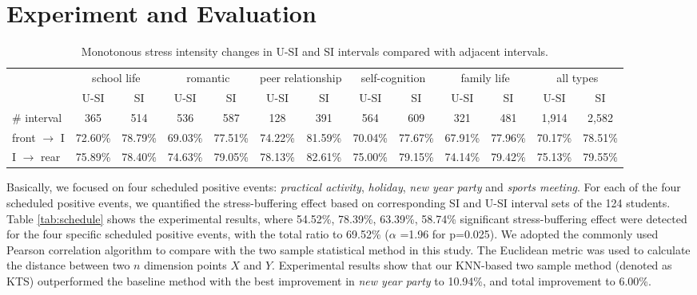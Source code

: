 
\section{Experiment and Evaluation}
\label{sec:experiment}

\begin{table}
\begin{center}
\caption{\small{Monotonous stress intensity changes in U-SI and SI intervals compared with adjacent intervals.}}
\small{
\begin{tabular}{l cccccc cccccc} \\\hline\hline
\multirow{2}{1cm}{}
&\multicolumn{2}{c}{school life}
&\multicolumn{2}{c}{romantic}
&\multicolumn{2}{c}{peer relationship}
&\multicolumn{2}{c}{self-cognition}
&\multicolumn{2}{c}{family life}
&\multicolumn{2}{c}{all types}\\
&U-SI	    &	SI	        &U-SI	    &SI	        &U-SI	   &SI	
&U-SI	    &	SI	        &	U-SI	&SI	        &U-SI	   &SI\\  \hline
\# interval         &   365	        &	514	        &	536	        &	587	        &128	    &	391	        &	564	           &	609	            &	321	        &	481	        &	1,914	    &2,582	 \\
front $\rightarrow$ I &	72.60\% &	78.79\% &	69.03\% 	&77.51\%   &74.22\%    &81.59\%    &70.04\%    &77.67\%  &67.91\%     &77.96\%    &70.17\%    &78.51\% \\
I $\rightarrow$ rear  &	75.89\% &	78.40\% &	74.63\% 	&79.05\%   &78.13\%    &82.61\%    &75.00\%    &79.15\%   &74.14\%    &79.42\%    &75.13\%    & 79.55\%\\ \hline \hline
\end{tabular}}%
\label{tab:fontrear}
\end{center}
\end{table}

Basically, we focused on four scheduled positive events:
\emph{practical activity}, \emph{holiday}, \emph{new year party} and \emph{sports meeting}.
For each of the four scheduled positive events,
we quantified the stress-buffering effect based on corresponding SI and U-SI interval sets of the 124 students.
Table \ref{tab:schedule} shows the experimental results,
where 54.52\%, 78.39\%, 63.39\%, 58.74\% significant stress-buffering effect were detected for the four specific scheduled positive events,
with the total ratio to 69.52\% ($\alpha$ =1.96 for p=0.025).
We adopted the commonly used Pearson correlation algorithm to compare with the two sample statistical method in this study.
The Euclidean metric was used to calculate the distance between two $n$ dimension points $X$ and $Y$.
Experimental results show that our KNN-based two sample method (denoted as KTS) outperformed the baseline method
with the best improvement in \emph{new year party} to 10.94\%,
and total improvement to 6.00\%.

